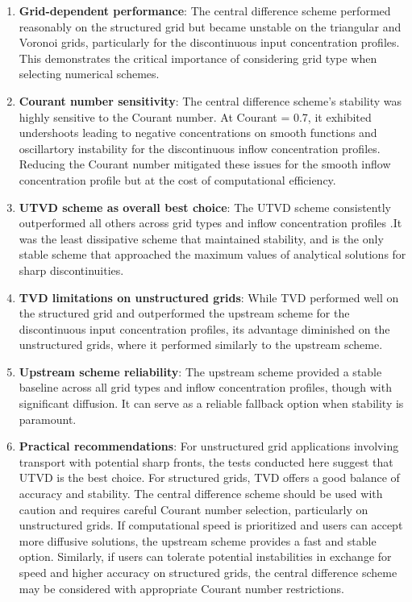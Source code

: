 \begin{enumerate}
\item \textbf{Grid-dependent performance}: The central difference scheme performed reasonably on the structured grid but became unstable on the triangular and Voronoi grids, particularly for the discontinuous input concentration profiles. This demonstrates the critical importance of considering grid type when selecting numerical schemes.

\item \textbf{Courant number sensitivity}: The central difference scheme's stability was highly sensitive to the Courant number. At Courant = 0.7, it exhibited undershoots leading to negative concentrations on smooth functions and oscillartory instability for the discontinuous inflow concentration profiles. Reducing the Courant number mitigated these issues for the smooth inflow concentration profile but at the cost of computational efficiency.

\item \textbf{UTVD scheme as overall best choice}: The UTVD scheme consistently outperformed all others across grid types and inflow concentration profiles .It was the least dissipative scheme that maintained stability, and is the only stable scheme that approached the maximum values of analytical solutions for sharp discontinuities.

\item \textbf{TVD limitations on unstructured grids}: While TVD performed well on the structured grid and outperformed the upstream scheme for the discontinuous input concentration profiles, its advantage diminished on the unstructured grids, where it performed similarly to the upstream scheme.

\item \textbf{Upstream scheme reliability}: The upstream scheme provided a stable baseline across all grid types and inflow concentration profiles, though with significant diffusion. It can serve as a reliable fallback option when stability is paramount.

\item \textbf{Practical recommendations}: For unstructured grid applications involving transport with potential sharp fronts, the tests conducted here suggest that UTVD is the best choice. For structured grids, TVD offers a good balance of accuracy and stability. The central difference scheme should be used with caution and requires careful Courant number selection, particularly on unstructured grids. If computational speed is prioritized and users can accept more diffusive solutions, the upstream scheme provides a fast and stable option. Similarly, if users can tolerate potential instabilities in exchange for speed and higher accuracy on structured grids, the central difference scheme may be considered with appropriate Courant number restrictions.
\end{enumerate}
